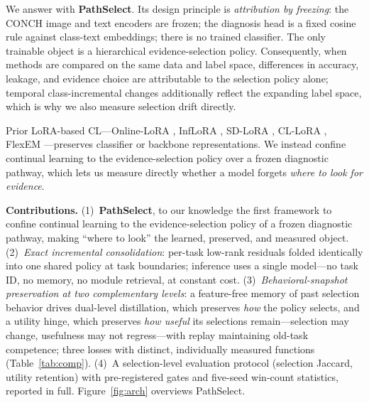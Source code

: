 \documentclass{article}
\begin{document}
We answer with \textbf{PathSelect}. Its design principle is \emph{attribution by freezing}: the CONCH image and text encoders \cite{lu2024conch} are frozen; the diagnosis head is a fixed cosine rule against class-text embeddings; there is no trained classifier. The only trainable object is a hierarchical evidence-selection policy. Consequently, when methods are compared on the same data and label space, differences in accuracy, leakage, and evidence choice are attributable to the selection policy alone; temporal class-incremental changes additionally reflect the expanding label space, which is why we also measure selection drift directly.

Prior LoRA-based CL---Online-LoRA \cite{wei2025onlinelora}, InfLoRA \cite{liang2024inflora}, SD-LoRA \cite{wu2025sdlora}, CL-LoRA \cite{he2025cllora}, FlexEM \cite{chen2026flexem}---preserves classifier or backbone representations. We instead confine continual learning to the evidence-selection policy over a frozen diagnostic pathway, which lets us measure directly whether a model forgets \emph{where to look for evidence}.

\textbf{Contributions.}
(1)~\textbf{PathSelect}, to our knowledge the first framework to confine continual learning to the evidence-selection policy of a frozen diagnostic pathway, making ``where to look'' the learned, preserved, and measured object.
(2)~\emph{Exact incremental consolidation}: per-task low-rank residuals folded identically into one shared policy at task boundaries; inference uses a single model---no task ID, no memory, no module retrieval, at constant cost.
(3)~\emph{Behavioral-snapshot preservation at two complementary levels}: a feature-free memory of past selection behavior drives dual-level distillation, which preserves \emph{how} the policy selects, and a utility hinge, which preserves \emph{how useful} its selections remain---selection may change, usefulness may not regress---with replay maintaining old-task competence; three losses with distinct, individually measured functions (Table~\ref{tab:comp}).
(4)~A selection-level evaluation protocol (selection Jaccard, utility retention) with pre-registered gates and five-seed win-count statistics, reported in full. Figure~\ref{fig:arch} overviews PathSelect.
\end{document}
